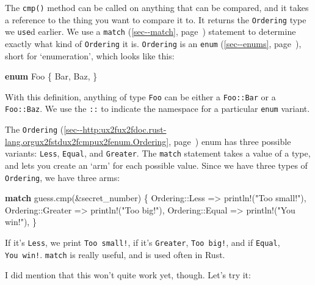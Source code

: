 \documentclass[a4paper,]{book}
\renewcommand*{\hyperref}[2][\ar]{%
  \def\ar{#2}%
  #2 (\autoref{#1}, page~\pageref{#1})}
\newenvironment{Shaded}{\begin{snugshade}}{\end{snugshade}}
\newcommand{\KeywordTok}[1]{\textcolor[rgb]{0.13,0.29,0.53}{\textbf{{#1}}}}
\newcommand{\StringTok}[1]{\textcolor[rgb]{0.31,0.60,0.02}{{#1}}}
\newcommand{\OtherTok}[1]{\textcolor[rgb]{0.56,0.35,0.01}{{#1}}}
\newcommand{\NormalTok}[1]{{#1}}
\begin{document}
The \texttt{cmp()} method can be called on anything that can be
compared, and it takes a reference to the thing you want to compare it
to. It returns the \texttt{Ordering} type we \texttt{use}d earlier. We
use a \hyperref[sec--match]{\texttt{match}} statement to determine
exactly what kind of \texttt{Ordering} it is. \texttt{Ordering} is an
\hyperref[sec--enums]{\texttt{enum}}, short for `enumeration', which
looks like this:

\begin{Shaded}
\begin{Highlighting}[]
\KeywordTok{enum} \NormalTok{Foo \{}
    \NormalTok{Bar,}
    \NormalTok{Baz,}
\NormalTok{\}}
\end{Highlighting}
\end{Shaded}

With this definition, anything of type \texttt{Foo} can be either a
\texttt{Foo::Bar} or a \texttt{Foo::Baz}. We use the \texttt{::} to
indicate the namespace for a particular \texttt{enum} variant.

The
\hyperref[sec--http:ux2fux2fdoc.rust-lang.orgux2fstdux2fcmpux2fenum.Ordering]{\texttt{Ordering}}
enum has three possible variants: \texttt{Less}, \texttt{Equal}, and
\texttt{Greater}. The \texttt{match} statement takes a value of a type,
and lets you create an `arm' for each possible value. Since we have
three types of \texttt{Ordering}, we have three arms:

\begin{Shaded}
\begin{Highlighting}[]
\KeywordTok{match} \NormalTok{guess.cmp(&secret_number) \{}
    \NormalTok{Ordering::Less    => }\OtherTok{println!}\NormalTok{(}\StringTok{"Too small!"}\NormalTok{),}
    \NormalTok{Ordering::Greater => }\OtherTok{println!}\NormalTok{(}\StringTok{"Too big!"}\NormalTok{),}
    \NormalTok{Ordering::Equal   => }\OtherTok{println!}\NormalTok{(}\StringTok{"You win!"}\NormalTok{),}
\NormalTok{\}}
\end{Highlighting}
\end{Shaded}

If it's \texttt{Less}, we print \texttt{Too\ small!}, if it's
\texttt{Greater}, \texttt{Too\ big!}, and if \texttt{Equal},
\texttt{You\ win!}. \texttt{match} is really useful, and is used often
in Rust.

I did mention that this won't quite work yet, though. Let's try it:
\end{document}
